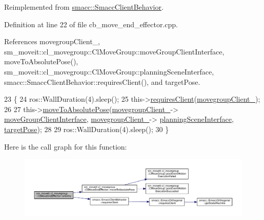 Reimplemented from \hyperlink{classsmacc_1_1SmaccClientBehavior_a7962382f93987c720ad432fef55b123f}{smacc\+::\+Smacc\+Client\+Behavior}.



Definition at line 22 of file cb\+\_\+move\+\_\+end\+\_\+effector.\+cpp.



References movegroup\+Client\+\_\+, sm\+\_\+moveit\+::cl\+\_\+movegroup\+::\+Cl\+Move\+Group\+::move\+Group\+Client\+Interface, move\+To\+Absolute\+Pose(), sm\+\_\+moveit\+::cl\+\_\+movegroup\+::\+Cl\+Move\+Group\+::planning\+Scene\+Interface, smacc\+::\+Smacc\+Client\+Behavior\+::requires\+Client(), and target\+Pose.


\begin{DoxyCode}
23 \{
24     ros::WallDuration(4).sleep();
25     this->\hyperlink{classsmacc_1_1SmaccClientBehavior_a917f001e763a1059af337bf4e164f542}{requiresClient}(\hyperlink{classsm__moveit_1_1cl__movegroup_1_1CbMoveEndEffector_a0bd042d152b3dbf881679c43c7330513}{movegroupClient\_});
26 
27     this->\hyperlink{classsm__moveit_1_1cl__movegroup_1_1CbMoveEndEffector_a334d4e9cb1db83ee4dfa8b8118983dcf}{moveToAbsolutePose}(\hyperlink{classsm__moveit_1_1cl__movegroup_1_1CbMoveEndEffector_a0bd042d152b3dbf881679c43c7330513}{movegroupClient\_}->
      \hyperlink{classsm__moveit_1_1cl__movegroup_1_1ClMoveGroup_a23acf6883455566dbab30e4367c2144d}{moveGroupClientInterface}, \hyperlink{classsm__moveit_1_1cl__movegroup_1_1CbMoveEndEffector_a0bd042d152b3dbf881679c43c7330513}{movegroupClient\_}->
      \hyperlink{classsm__moveit_1_1cl__movegroup_1_1ClMoveGroup_a26b5c9e0aef1cd67ee977a756b69cf76}{planningSceneInterface}, \hyperlink{classsm__moveit_1_1cl__movegroup_1_1CbMoveEndEffector_aa0b15a6432dd78c81bb242561a712796}{targetPose});
28 
29     ros::WallDuration(4).sleep();
30 \}
\end{DoxyCode}


Here is the call graph for this function\+:
\nopagebreak
\begin{figure}[H]
\begin{center}
\leavevmode
\includegraphics[width=350pt]{classsm__moveit_1_1cl__movegroup_1_1CbMoveEndEffector_a5283300e460b4a2665537e0c0388e68b_cgraph}
\end{center}
\end{figure}


